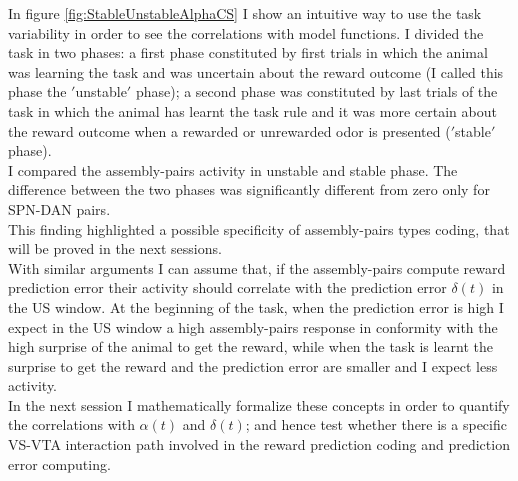 In figure \ref{fig:StableUnstableAlphaCS} I show an intuitive way to use the task variability in order to see the correlations with model functions. I divided the task in two phases: a first phase constituted by first trials in which the animal was learning the task and was uncertain about the reward outcome (I called this phase the $'$unstable$'$ phase); a second phase was constituted by last trials of the task in which the animal has learnt the task rule and it was more certain about the reward outcome when a rewarded or unrewarded odor is presented ($'$stable$'$ phase).\\I compared the assembly-pairs activity in unstable and stable phase. The difference between the two phases was significantly different from zero only for SPN-DAN pairs.\\This finding highlighted a possible specificity of assembly-pairs types coding, that will be proved in the next sessions.\\With similar arguments I can assume that, if the assembly-pairs compute reward prediction error their activity should correlate with the prediction error $\delta(t)$ in the US window. At the beginning of the task, when the prediction error is high I expect in the US window a high assembly-pairs response in conformity with the high surprise of the animal to get the reward, while when the task is learnt the surprise to get the reward and the prediction error are smaller and I expect less activity.\\In the next session I mathematically formalize these concepts in order to quantify the correlations with $\alpha(t)$ and $\delta(t)$; and hence test whether there is a specific VS-VTA interaction path involved in the reward prediction coding and prediction error computing. 

